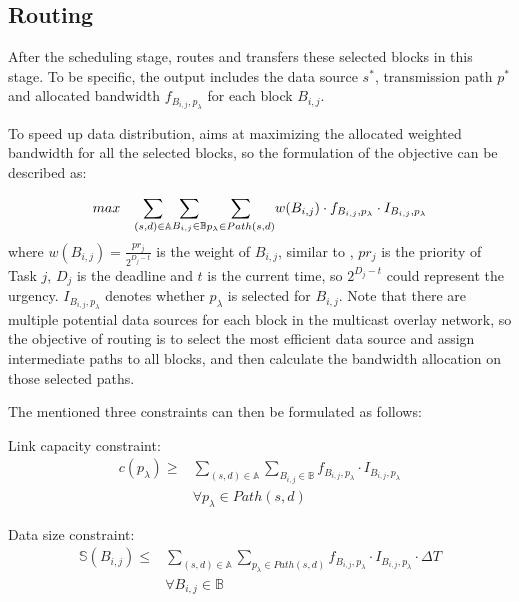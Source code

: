 \subsection{Routing}
\label{subsec:logic:routing}

After the scheduling stage, \name routes and transfers these selected blocks in this stage. To be specific, the output includes the data source $s^*$, transmission path $p^*$ and allocated bandwidth $f_{B_{i,j},p_\lambda}$ for each block $B_{i,j}$.

To speed up data distribution, \name aims at maximizing the allocated weighted bandwidth for all the selected blocks, so the formulation of the objective can be described as:

\begin{equation}
\centering
max \quad \displaystyle{\sum_{(s,d)\in \mathbb{A}}} \displaystyle{\sum_{B_{i,j} \in \mathbb{B}}} \displaystyle{\sum_{p_{\lambda}\in Path(s,d)}} w(B_{i,j})\cdot f_{B_{i,j},p_\lambda} \cdot I_{B_{i,j},p_\lambda}
\end{equation}
where $w(B_{i,j}) = \frac{pr_j}{2^{D_j-t}}$ is the weight of $B_{i,j}$, similar to \cite{zhang2015guaranteeing}, $pr_j$ is the priority of Task $j$, $D_j$ is the deadline and $t$ is the current time, so $2^{D_j-t}$ could represent the urgency. $I_{B_{i,j},p_\lambda}$ denotes whether $p_\lambda$ is selected for $B_{i,j}$. Note that there are multiple potential data sources for each block in the multicast overlay network, so the objective of routing is to select the most efficient data source and assign intermediate paths to all blocks, and then calculate the bandwidth allocation on those selected paths.

The mentioned three constraints can then be formulated as follows:

Link capacity constraint:
\begin{equation}
\begin{split}
c(p_\lambda) \geq & \displaystyle{\sum_{(s,d)\in \mathbb{A}}} \displaystyle{\sum_{B_{i,j} \in \mathbb{B}}} f_{B_{i,j},p_\lambda} \cdot I_{B_{i,j},p_\lambda}\\
& \forall p_\lambda \in Path(s,d) \label{st:capacity}
\end{split}
\end{equation}

Data size constraint:
\begin{equation}
\begin{split}
\mathbb{S}(B_{i,j}) \leq & \displaystyle{\sum_{(s,d)\in \mathbb{A}}} \displaystyle{\sum_{p_{\lambda}\in Path(s,d)}} f_{B_{i,j},p_\lambda} \cdot I_{B_{i,j},p_\lambda} \cdot \Delta T\\
& \forall B_{i,j} \in \mathbb{B} \label{st:size}\\
\end{split}
\end{equation}

